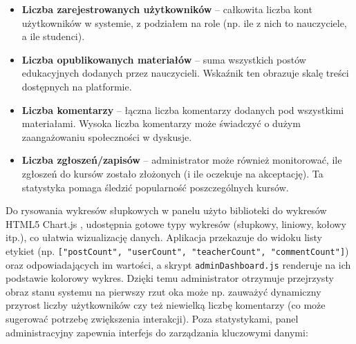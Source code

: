 \begin{itemize}
\item \textbf{Liczba zarejestrowanych użytkowników} – całkowita liczba kont użytkowników w systemie, z podziałem na role (np. ile z nich to nauczyciele, a ile studenci).
\item \textbf{Liczba opublikowanych materiałów} – suma wszystkich postów edukacyjnych dodanych przez nauczycieli. Wskaźnik ten obrazuje skalę treści dostępnych na platformie.
\item \textbf{Liczba komentarzy} – łączna liczba komentarzy dodanych pod wszystkimi materiałami. Wysoka liczba komentarzy może świadczyć o dużym zaangażowaniu społeczności w dyskusje.
\item \textbf{Liczba zgłoszeń/zapisów} – administrator może również monitorować, ile zgłoszeń do kursów zostało złożonych (i ile oczekuje na akceptację). Ta statystyka pomaga śledzić popularność poszczególnych kursów.
\end{itemize} Do rysowania wykresów słupkowych w panelu użyto biblioteki do wykresów HTML5 Chart.js
, udostępnia gotowe typy wykresów (słupkowy, liniowy, kołowy itp.), co ułatwia wizualizację danych. Aplikacja przekazuje do widoku listy etykiet (np. \texttt{["postCount", "userCount", "teacherCount", "commentCount"]}) oraz odpowiadających im wartości, a skrypt \texttt{adminDashboard.js} renderuje na ich podstawie kolorowy wykres. Dzięki temu administrator otrzymuje przejrzysty obraz stanu systemu na pierwszy rzut oka może np. zauważyć dynamiczny przyrost liczby użytkowników czy też niewielką liczbę komentarzy (co może sugerować potrzebę zwiększenia interakcji). Poza statystykami, panel administracyjny zapewnia interfejs do zarządzania kluczowymi danymi:
